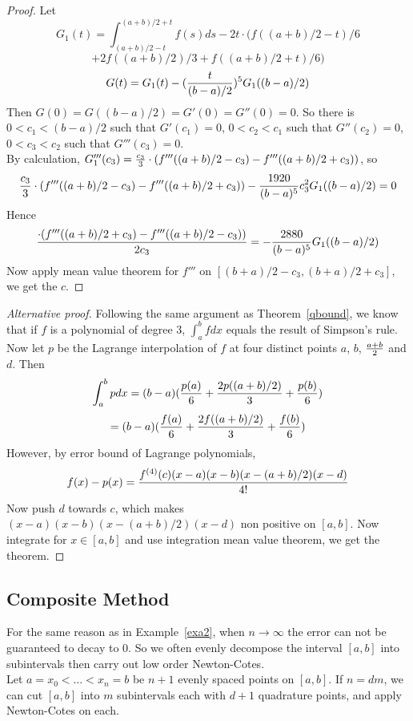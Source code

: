 \documentclass{article} %
\theoremstyle{break}
\begin{document}
\begin{proof}
  Let
  \[G_1(t)=\int_{(a+b)/2-t}^{(a+b)/2+t}f(s)ds-2t\cdot(f((a+b)/2-t)/6\]
  \[+2f((a+b)/2)/3+f((a+b)/2+t)/6)\]
  \[G(t)=G_1(t)-({t\over (b-a)/2})^5G_1((b-a)/2)\]
  Then $G(0)=G((b-a)/2)=G'(0)=G''(0)=0$. So there is $0<c_1<(b-a)/2$ such that $G'(c_1)=0$, $0<c_2<c_1$ such that $G''(c_2)=0$, $0<c_3<c_2$ such that $G'''(c_3)=0$.\\

By calculation, $G_1'''(c_3)={c_3\over 3}\cdot(f'''((a+b)/2-c_3)-f'''((a+b)/2+c_3))$, so
\[{c_3\over 3}\cdot(f'''((a+b)/2-c_3)-f'''((a+b)/2+c_3))-{1920\over (b-a)^5}c_3^2G_1((b-a)/2)=0\]
Hence
\[{\cdot(f'''((a+b)/2+c_3)-f'''((a+b)/2-c_3))\over 2c_3}=-{2880\over (b-a)^5}G_1((b-a)/2)\]
Now apply mean value theorem for $f'''$ on $[(b+a)/2-c_3, (b+a)/2+c_3]$, we get the $c$. 
\end{proof}

\begin{proof}[Alternative proof]
  Following the same argument as Theorem~\ref{qbound}, we know that if $f$ is a polynomial of degree $3$, $\int_a^bfdx$ equals the result of Simpson's rule.\\

  Now let $p$ be the Lagrange interpolation of $f$ at four distinct points $a$, $b$, $a+b\over 2$ and $d$. Then
  \[\int_a^bpdx=(b-a)({p(a)\over 6}+{2p((a+b)/2)\over 3}+{p(b)\over 6})\]
  \[=(b-a)({f(a)\over 6}+{2f((a+b)/2)\over 3}+{f(b)\over 6})\]
  However, by error bound of Lagrange polynomials, 
  \[f(x)-p(x)={f^{(4)}(c)(x-a)(x-b)(x-(a+b)/2)(x-d)\over 4!}\]
  Now push $d$ towards $c$, which makes $(x-a)(x-b)(x-(a+b)/2)(x-d)$ non positive on $[a, b]$. Now integrate for $x\in [a, b]$ and use integration mean value theorem, we get the theorem.
\end{proof}


\subsection{Composite Method}

For the same reason as in Example~\ref{exa2}, when $n\rightarrow\infty$ the error can not be guaranteed to decay to $0$. So we often evenly decompose the interval $[a, b]$ into subintervals then carry out low order Newton-Cotes.\\

Let $a=x_0<\dots<x_n=b$ be $n+1$ evenly spaced points on $[a, b]$. If $n=dm$, we can cut $[a, b]$ into $m$ subintervals each with $d+1$ quadrature points, and apply Newton-Cotes on each.\\
\end{document}
